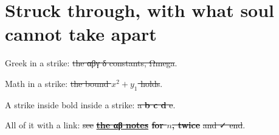 \documentclass[
]{article}
\author{}
\date{}
\begin{document}
\section{Struck through, with what soul cannot take
apart}\label{struck-through-with-what-soul-cannot-take-apart}

Greek in a strike: \st{the \mbox{αβγ} \mbox{δ} constants, \mbox{Ω}mega}.

Math in a strike: \st{the bound \mbox{\(x^2 + y_1\)} holds}.

A strike inside bold inside a strike: \st{a \textbf{b c d} e}.

All of it with a link: \st{see }\textbf{\href{titled.md}{\st{the
\mbox{αβ} notes}}\st{ for \mbox{\(n\)}, twice}}\st{ and \mbox{✓} end}.
\end{document}
